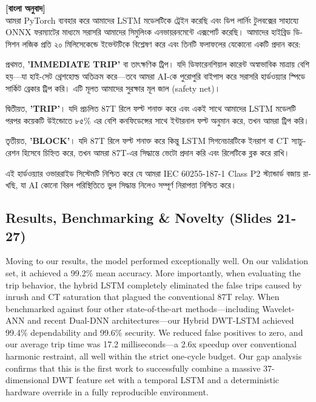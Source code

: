 \documentclass[12pt]{article}
\begin{document}
\begin{bengali}
\textbf{[বাংলা অনুবাদ]} \\
আমরা PyTorch ব্যবহার করে আমাদের LSTM মডেলটিকে ট্রেইন করেছি এবং ডিপ লার্নিং টুলবক্সের সাহায্যে ONNX ফরম্যাটের মাধ্যমে সরাসরি আমাদের সিমুলিংক এনভায়রনমেন্টে এক্সপোর্ট করেছি। আমাদের হাইব্রিড ডিসিশন লজিক প্রতি ২০ মিলিসেকেন্ডে ইভেন্টটিকে বিশ্লেষণ করে এবং তিনটি ফলাফলের যেকোনো একটি প্রদান করে:

প্রথমত, \textbf{'IMMEDIATE TRIP'} বা তাৎক্ষণিক ট্রিপ। যদি ডিফারেনশিয়াল কারেন্ট অস্বাভাবিক মাত্রায় বেশি হয়—যা হাই-সেট থ্রেশহোল্ড অতিক্রম করে—তবে আমরা AI-কে পুরোপুরি বাইপাস করে সরাসরি হার্ডওয়্যার স্পিডে সার্কিট ব্রেকার ট্রিপ করি। এটি মূলত আমাদের সুরক্ষার মূল জাল (safety net)।

দ্বিতীয়ত, \textbf{'TRIP'}। যদি প্রচলিত 87T রিলে ফল্ট শনাক্ত করে এবং একই সাথে আমাদের LSTM মডেলটি পরপর কয়েকটি উইন্ডোতে ৮৫\% এর বেশি কনফিডেন্সের সাথে ইন্টারনাল ফল্ট অনুমান করে, তখন আমরা ট্রিপ করি।

তৃতীয়ত, \textbf{'BLOCK'}। যদি 87T রিলে ফল্ট শনাক্ত করে কিন্তু LSTM সিগনেচারটিকে ইনরাশ বা CT স্যাচুরেশন হিসেবে চিহ্নিত করে, তখন আমরা 87T-এর সিদ্ধান্তে ভেটো প্রদান করি এবং রিলেটিকে ব্লক করে রাখি।

এই হার্ডওয়্যার ওভাররাইড সিস্টেমটি নিশ্চিত করে যে আমরা IEC 60255-187-1 Class P2 স্ট্যান্ডার্ড বজায় রাখছি, যা AI কোনো বিরল পরিস্থিতিতে ভুল সিদ্ধান্ত নিলেও সম্পূর্ণ নিরাপত্তা নিশ্চিত করে।
\end{bengali}

\subsection*{Results, Benchmarking \& Novelty (Slides 21-27)}
Moving to our results, the model performed exceptionally well. On our validation set, it achieved a 99.2\% mean accuracy. More importantly, when evaluating the trip behavior, the hybrid LSTM completely eliminated the false trips caused by inrush and CT saturation that plagued the conventional 87T relay. When benchmarked against four other state-of-the-art methods—including Wavelet-ANN and recent Dual-DNN architectures—our Hybrid DWT-LSTM achieved 99.4\% dependability and 99.6\% security. We reduced false positives to zero, and our average trip time was 17.2 milliseconds—a 2.6x speedup over conventional harmonic restraint, all well within the strict one-cycle budget. Our gap analysis confirms that this is the first work to successfully combine a massive 37-dimensional DWT feature set with a temporal LSTM and a deterministic hardware override in a fully reproducible environment.
\end{document}
